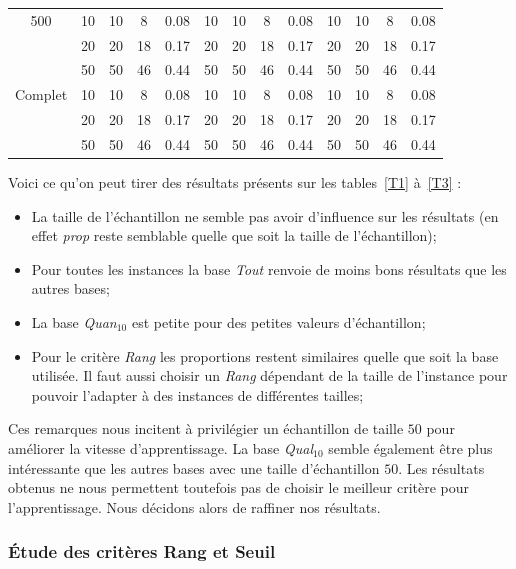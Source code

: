 \documentclass[a4paper,11pt]{article}%
\begin{document}
\begin{table}[p]
\begin{center}
\begin{tabular}{|@{}c@{}|@{}c@{}|@{}c@{}|@{}c@{}|@{}c@{}||@{}c@{}|@{}c@{}|@{}c@{}|@{}c@{}||@{}c@{}|@{}c@{}|@{}c@{}|@{}c@{}|}
  \hline
   500 & 10& 10 & 8 & 0.08 & 10& 10 & 8 & 0.08 & 10&  10& 8 & 0.08  \\
 \cline{2-13} 
    & 20&20 & 18 & 0.17 & 20& 20& 18 & 0.17 & 20&20 & 18 & 0.17  \\
  \cline{2-13} 
    & 50&50 & 46 & 0.44 & 50&50 & 46 & 0.44 & 50& 50 & 46 & 0.44  \\
  \hline
   Complet & 10& 10 & 8 & 0.08 & 10& 10 & 8 & 0.08 & 10& 10 & 8 & 0.08  \\
 \cline{2-13} 
    & 20&20 & 18 & 0.17 & 20&20 & 18 & 0.17 & 20&20 & 18 & 0.17  \\
  \cline{2-13} 
    & 50& 50& 46 & 0.44 & 50&50 & 46 & 0.44 & 50&50 & 46 & 0.44  \\
  \hline
\end{tabular}
\end{center}
\end{table}

Voici ce qu'on peut tirer des résultats présents sur les tables~\ref{T1} à~\ref{T3} :

\begin{itemize}
\item La taille de l'échantillon ne semble pas avoir d'influence sur les résultats (en effet \emph{prop} reste semblable quelle que soit la taille de l'échantillon);
\item Pour toutes les instances la base \emph{Tout} renvoie de moins bons résultats que les autres bases;
\item La base \emph{Quan$_{10}$} est petite pour des petites valeurs d'échantillon;
\item Pour le critère \emph{Rang} les proportions restent similaires quelle que soit la base utilisée. Il faut aussi choisir un \emph{Rang} dépendant de la taille de l'instance pour pouvoir l'adapter à des instances de différentes tailles;
\end{itemize}

Ces remarques nous incitent à privilégier un échantillon de taille $50$ pour améliorer la vitesse d'apprentissage. 
La base \emph{Qual$_{10}$} semble également être plus intéressante que les autres bases avec une taille d'échantillon $50$.
Les résultats obtenus ne nous permettent toutefois pas de choisir le meilleur critère pour l'apprentissage.
Nous décidons alors de raffiner nos résultats.

\subsubsection{Étude des critères Rang et Seuil}
\end{document}
